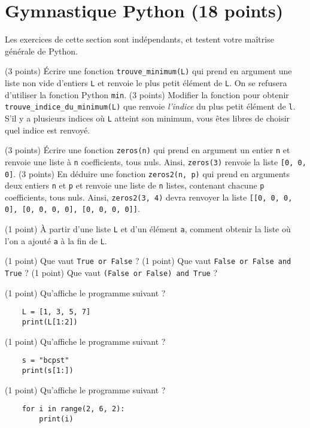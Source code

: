 \section*{Gymnastique Python (18 points)}

Les exercices de cette section sont indépendants, et testent votre maîtrise générale de Python.

\quessques (3 points) Écrire une fonction \texttt{trouve_minimum(L)} qui prend en argument une liste non vide d'entiers \texttt{L} et renvoie le plus petit élément de \texttt{L}. On se refusera d'utiliser la fonction Python \texttt{min}.
\ssques (3 points) Modifier la fonction pour obtenir \texttt{trouve_indice_du_minimum(L)} que renvoie \textit{l'indice} du plus petit élément de \texttt{l}. S'il y a plusieurs indices où \texttt{L} atteint son minimum, vous êtes libres de choisir quel indice est renvoyé.

\quessques (3 points) Écrire une fonction \texttt{zeros(n)} qui prend en argument un entier \texttt{n} et renvoie une liste à \texttt{n} coefficients, tous nuls. Ainsi, \texttt{zeros(3)} renvoie la liste \texttt{[0, 0, 0]}.
\ssques (3 points) En déduire une fonction \texttt{zeros2(n, p)} qui prend en arguments deux entiers \texttt{n} et \texttt{p} et renvoie une liste de \texttt{n} listes, contenant chacune \texttt{p} coefficients, tous nuls. Ainsi, \texttt{zeros2(3, 4)} devra renvoyer la liste \texttt{[[0, 0, 0, 0], [0, 0, 0, 0], [0, 0, 0, 0]]}.

\ques (1 point) À partir d'une liste \texttt{L} et d'un élément \texttt{a}, comment obtenir la liste où l'on a ajouté \texttt{a} à la fin de \texttt{L}.

\quessques (1 point) Que vaut \texttt{True or False} ?
\ssques (1 point) Que vaut \texttt{False or False and True} ?
\ssques (1 point) Que vaut \texttt{(False or False) and True} ?

\quessques (1 point) Qu'affiche le programme suivant ?

\begin{verbatim}
    L = [1, 3, 5, 7]
    print(L[1:2])
\end{verbatim}

\ssques (1 point) Qu'affiche le programme suivant ? 

\begin{verbatim}
    s = "bcpst"
    print(s[1:])
\end{verbatim}

\ssques (1 point) Qu'affiche le programme suivant ? 

\begin{verbatim}
    for i in range(2, 6, 2):
        print(i)
\end{verbatim}
